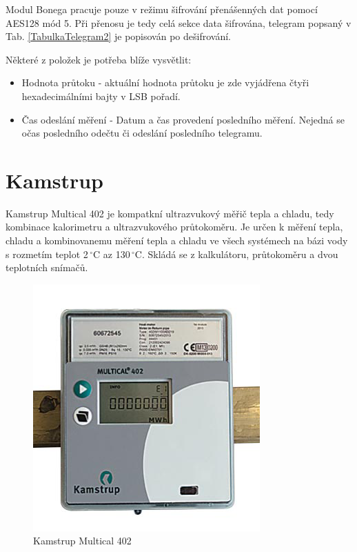\newpage{}

Modul Bonega pracuje pouze v režimu šifrování přenášenných dat pomocí AES128 mód 5. Při přenosu je tedy celá sekce data šifrována, telegram popsaný v Tab. \ref{TabulkaTelegram2} je popisován po dešifrování.

Některé z položek je potřeba blíže vysvětlit:

\begin{itemize}
	\item Hodnota průtoku - aktuální hodnota průtoku je zde vyjádřena čtyři hexadecimálními bajty v LSB pořadí.
	\item Čas odeslání měření - Datum a čas provedení posledního měření. Nejedná se očas posledního odečtu či odeslání posledního telegramu.
\end{itemize}



	
	\section{Kamstrup}
	
	Kamstrup Multical 402 je kompatkní ultrazvukový měřič tepla a chladu, tedy kombinace kalorimetru a ultrazvukového průtokoměru. Je určen k měření tepla, chladu a kombinovanemu měření tepla a chladu ve všech systémech na bázi vody s rozmetím teplot 2\,$^{\circ}$C az 130\,$^{\circ}$C. Skládá se z kalkulátoru, průtokoměru a dvou teplotních snímačů. 
	
 \begin{figure}[!ht]
\vspace{-20pt}
  \begin{center}
    \includegraphics[scale=0.7]{obrazky/zarizeni_kamstrup}
  \end{center}
	\vspace{-30pt}
  \caption{Kamstrup Multical 402~\cite{CidloKamstrup}}
	\vspace{-20pt}
\end{figure}
	
